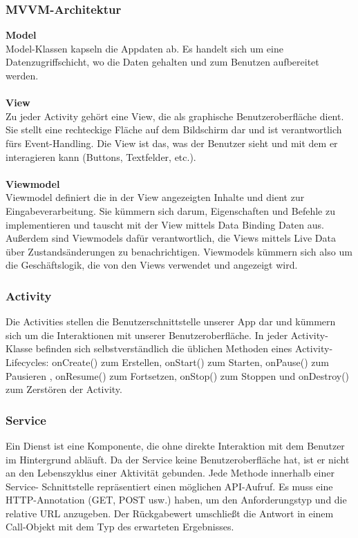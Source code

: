 \subsubsection{MVVM-Architektur}

\textbf{Model}\\
Model-Klassen kapseln die Appdaten ab. Es handelt sich um eine Datenzugriffschicht, wo die Daten gehalten und zum Benutzen aufbereitet werden. \\
\\ \textbf{View}\\
Zu jeder Activity gehört eine View, die als graphische Benutzeroberfläche dient. Sie stellt eine rechteckige Fläche auf dem Bildschirm dar und ist verantwortlich fürs Event-Handling. Die View ist das, was der Benutzer sieht und mit dem er interagieren kann (Buttons, Textfelder, etc.).\\
\\ \textbf{Viewmodel}\\
Viewmodel definiert die in der View angezeigten Inhalte und dient zur Eingabeverarbeitung. Sie kümmern sich darum, Eigenschaften und Befehle zu implementieren und tauscht mit der View mittels Data Binding Daten aus. Außerdem sind Viewmodels dafür verantwortlich, die Views mittels Live Data über Zustandsänderungen zu benachrichtigen. Viewmodels kümmern sich also um die Geschäftslogik, die von den Views verwendet und angezeigt wird.\\

\subsubsection{Activity}
Die Activities stellen die Benutzerschnittstelle unserer App dar und kümmern sich um die Interaktionen mit unserer Benutzeroberfläche. In jeder Activity-Klasse befinden sich selbstverständlich die üblichen Methoden eines Activity-Lifecycles: onCreate() zum Erstellen, onStart() zum Starten, onPause() zum Pausieren , onResume() zum Fortsetzen, onStop() zum Stoppen und onDestroy() zum Zerstören der Activity.

\subsubsection{Service}
Ein Dienst ist eine Komponente, die ohne direkte Interaktion mit dem Benutzer im Hintergrund abläuft. Da der Service keine Benutzeroberfläche hat, ist er nicht an den Lebenszyklus einer Aktivität gebunden.
Jede Methode innerhalb einer Service- Schnittstelle repräsentiert einen möglichen API-Aufruf. Es muss eine HTTP-Annotation (GET, POST usw.) haben, um den Anforderungstyp und die relative URL anzugeben. Der Rückgabewert umschließt die Antwort in einem Call-Objekt mit dem Typ des erwarteten Ergebnisses.


